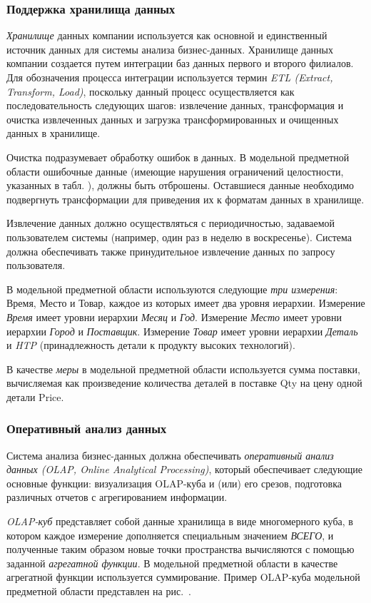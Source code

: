\subsubsection{Поддержка хранилища данных}
\textit{Хранилище} данных компании используется как основной и единственный 
источник данных для системы анализа бизнес-данных. Хранилище данных компании 
создается путем интеграции баз данных первого и второго филиалов. Для 
обозначения процесса интеграции используется термин \textit{ETL (Extract, 
Transform, Load)}, поскольку данный процесс осуществляется как 
последовательность следующих шагов: извлечение данных, трансформация и очистка 
извлеченных данных и загрузка трансформированных и очищенных данных в хранилище. 
\par
Очистка подразумевает обработку ошибок в данных. В модельной предметной области 
ошибочные данные (имеющие нарушения ограничений целостности, указанных в табл. 
), должны быть отброшены. Оставшиеся данные необходимо 
подвергнуть трансформации для приведения их к форматам данных в хранилище.\par
Извлечение данных должно осуществляться с периодичностью, задаваемой 
пользователем системы (например, один раз в неделю в воскресенье). Система 
должна обеспечивать также принудительное извлечение данных по запросу 
пользователя.\par
В модельной предметной области используются следующие \textit{три измерения}: 
Время, Место и Товар, каждое из которых имеет два уровня иерархии. Измерение 
\textit{Время} имеет уровни иерархии \textit{Месяц} и \textit{Год}. Измерение 
\textit{Место} имеет уровни иерархии \textit{Город} и \textit{Поставщик}. 
Измерение \textit{Товар} имеет уровни иерархии \textit{Деталь} и \textit{HTP} 
(принадлежность детали к продукту высоких технологий).\par
В качестве \textit{меры} в модельной предметной области используется сумма 
поставки, вычисляемая как произведение количества деталей в поставке Qty на цену 
одной детали Price.\par

\subsubsection{Оперативный анализ данных}
Система анализа бизнес-данных должна обеспечивать \textit{оперативный анализ 
данных (OLAP, Online Analytical Processing)}, который обеспечивает следующие 
основные функции: визуализация OLAP-куба и (или) его срезов, подготовка 
различных отчетов с агрегированием информации. \par
\textit{OLAP-куб} представляет собой данные хранилища в виде многомерного куба, 
в котором каждое измерение дополняется специальным значением \textit{ВСЕГО}, и 
полученные таким образом новые точки пространства вычисляются с помощью 
заданной \textit{агрегатной функции}.
В модельной предметной области в качестве агрегатной функции используется суммирование. Пример OLAP-куба модельной предметной области представлен на рис.~.

